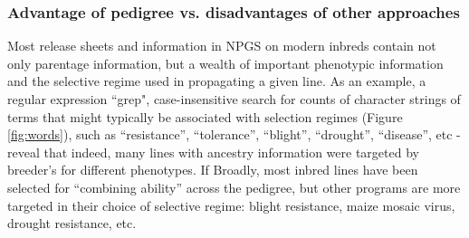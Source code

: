 \documentclass[final,12pt]{article}
\begin{document}
\subsubsection*{Advantage of pedigree vs. disadvantages of other approaches}
Most release sheets and information in NPGS on modern inbreds contain not only parentage information, but a wealth of important phenotypic information and the selective regime used in propagating a given line. 
As an example, a regular expression ``grep", case-insensitive search for counts of character strings of terms that might typically be associated with selection regimes  (Figure \ref{fig:words}), such as ``resistance'', ``tolerance'', ``blight'', ``drought'', ``disease'', etc - reveal that indeed, many lines with ancestry information were targeted by breeder's for different phenotypes. 
If 
Broadly, most inbred lines have been selected for ``combining ability'' across the pedigree, but other programs are more targeted in their choice of selective regime: blight resistance, maize mosaic virus, drought resistance, etc. 
\end{document}
